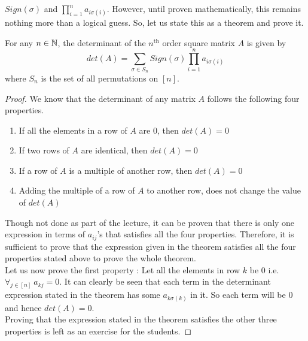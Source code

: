 $Sign(\sigma)$ and $\prod_{i=1}^{n} a_{i\sigma(i)}$. However, until proven mathematically, this remains nothing more than a logical guess. So, let us state this as a theorem and prove it.
\begin{theorem}
For any $n \in \mathbb{N}$, the determinant of the $n^{\text{th}}$ order square matrix $A$ is given by
$$det(A) = \sum_{\sigma \in S_n} Sign(\sigma)  \prod_{i=1}^{n} a_{i\sigma(i)}$$
where $S_n$ is the set of all permutations on $[n]$. 
\end{theorem}
\begin{proof}
We know that the determinant of any matrix $A$ follows the following four properties.
\begin{enumerate}
    \item If all the elements in a row of $A$ are 0, then $det(A)=0$
    \item If two rows of $A$ are identical, then $det(A)=0$
    \item If a row of $A$ is a multiple of another row, then $det(A)=0$
    \item Adding the multiple of a row of $A$ to another row, does not change the value of $det(A)$
\end{enumerate}
Though not done as part of the lecture, it can be proven that there is only one expression in terms of $a_{ij}$'s that satisfies all the four properties. Therefore, it is sufficient to prove that the expression given in the theorem satisfies all the four properties stated above to prove the whole theorem. \\
Let us now prove the first property : Let all the elements in row $k$ be 0 i.e. $\forall_{j\in[n]}~ a_{kj} = 0$. It can clearly be seen that each term in the determinant expression stated in the theorem has some $a_{k\sigma(k)}$ in it. So each term will be 0 and hence $det(A)=0$. \\
Proving that the expression stated in the theorem satisfies the other three properties is left as an exercise for the students.
\end{proof}

